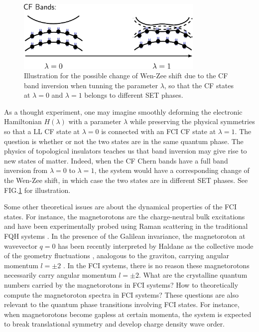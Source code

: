 \begin{figure}[!htp]
    \centering
    \includegraphics[width=0.8\textwidth]{contents/FCI_ProjWfc/figures/CF_band_Wen-Zee_shift_transition.pdf}
    \caption{Illustration for the possible change of Wen-Zee shift due to the CF band inversion when tunning the parameter $\lambda$, so that the CF states at $\lambda=0$ and $\lambda=1$ belongs to different SET phases.}
    \label{fig:CF band inversion}
\end{figure}

As a thought experiment, one may imagine smoothly deforming the electronic Hamiltonian $H(\lambda)$ with a parameter $\lambda$ while preserving the physical symmetries so that a LL CF state at $\lambda=0$ is connected with an FCI CF state at $\lambda=1$. The question is whether or not the two states are in the same quantum phase.  The physics of topological insulators teaches us that band inversion may give rise to new states of matter. Indeed, when the CF Chern bands have a full band inversion from $\lambda=0$ to $\lambda=1$, the system would have a corresponding change of the Wen-Zee shift, in which case the two states are in different SET phases. See FIG.\ref{fig:CF band inversion} for illustration.

Some other theoretical issues are about the dynamical properties of the FCI states. For instance, the magnetorotons are the charge-neutral bulk excitations and have been experimentally probed using Raman scattering in the traditional FQH systems \cite{pinczuk1998light,kang2000inelastic,kukushkin2009dispersion}. In the presence of the Galilean invariance, the magnetoroton at wavevector $q=0$ has been recently interpreted by Haldane as the collective mode of the geometry fluctuations \cite{haldane2011geometrical,haldane2009hall}, analogous to the graviton, carrying angular momentum $l=\pm 2$ \cite{yang2012model}.  In the FCI systems, there is no reason these magnetorotons necessarily carry angular momentum  $l=\pm 2$. What are the crystalline quantum numbers carried by the magnetorotons in FCI systems? How to theoretically compute the magnetoroton spectra in FCI systems? These questions are also relevant to the quantum phase transitions involving FCI states. For instance, when magnetorotons become gapless at certain momenta, the system is expected to break translational symmetry and develop charge density wave order.

